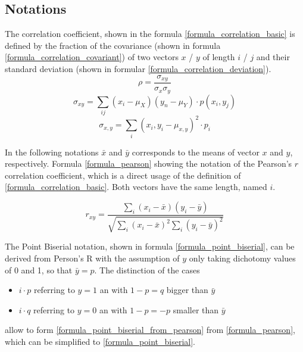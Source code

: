 \documentclass[a4paper,12pt]{report}
\begin{document}
\bigskip

\subsection{Notations}
\par The correlation coefficient, shown in the formula \ref{formula_correlation_basic} is defined by the fraction of the covariance (shown in formula \ref{formula_correlation_covariant}) of two vectors $x$ / $y$ of length $i$ / $j$ and their standard deviation (shown in formular \ref{formula_correlation_deviation}). \cite{HerzSchlicherSiegener1992}
\smallskip
\begin{equation}
\label{formula_correlation_basic}
	\rho = \frac{\sigma_{xy}}{\sigma_{x}\sigma_{y}}
\end{equation}
\begin{equation}
\label{formula_correlation_covariant}
	\sigma_{xy} = \sum_{ij}(x_i-\mu_X)(y_n-\mu_Y) \cdot p(x_i,y_j)
\end{equation}
\begin{equation}
\label{formula_correlation_deviation}
	\sigma_{x,y} = \sum_{i}(x_i,y_i-\mu_{x,y})^2 \cdot p_i
\end{equation}

\bigskip

\par In the following notations $\bar{x}$ and $\bar{y}$ corresponds to the means of vector $x$ and $y$, respectively. Formula \ref{formula_pearson} showing the notation of the Pearson's $r$ correlation coefficient, which is a direct usage of the definition of \ref{formula_correlation_basic}. Both vectors have the same length, named $i$. 
	\cite{BenestyChenHuang2009,Zychlinski2018}
	
\smallskip

\begin{equation}
\label{formula_pearson}	
	r_{xy} =  \frac{\sum_{i}{(x_i-\bar{x})(y_i-\bar{y})}}{\sqrt{\sum_{i}{(x_i-\bar{x})^2}\sum_{i}{(y_i-\bar{y})^2}}}
\end{equation}

\bigskip

The Point Biserial notation, shown in formula \ref{formula_point_biserial}, can be derived from Person's R with the assumption of $y$ only taking dichotomy values of 0 and 1, so that $\bar{y} = p$. The distinction of the cases 
\begin{itemize}
	\item $i \cdot p$ referring to $y=1$ an with $1 - p = q$ bigger than $\bar{y}$
	\item $i \cdot q$ referring to $y=0$ an with $1 - p = -p$ smaller than $\bar{y}$
\end{itemize}
allow to form \ref{formula_point_biserial_from_pearson} from \ref{formula_pearson}, which can be simplified to \ref{formula_point_biserial}. \cite{Tate1954,CohenWest2003,Bortz2004}
\end{document}
